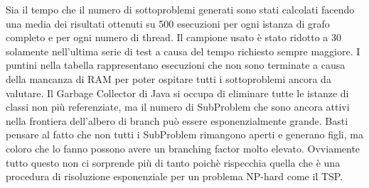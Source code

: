 \documentclass[
	article,			%
	12pt,				%
	oneside,			%
	a4paper,			%
	english,			%
	italian,				%
	sumario=tradicional,
	]{abntex2}
\begin{document}
Sia il tempo che il numero di sottoproblemi generati sono stati calcolati facendo una media dei risultati ottenuti su 500 esecuzioni per ogni istanza di grafo completo e per ogni numero di thread. Il campione usato è stato ridotto a 30 solamente nell'ultima serie di test a causa del tempo richiesto sempre maggiore.
I puntini nella tabella rappresentano esecuzioni che non sono terminate a causa della mancanza di RAM per poter ospitare tutti i sottoproblemi ancora da valutare. Il {\selectfont Garbage Collector} di Java si occupa di eliminare tutte le istanze di classi non più referenziate, ma il numero di {\selectfont SubProblem} che sono ancora attivi nella frontiera dell'albero di branch può essere esponenzialmente grande. Basti pensare al fatto che non tutti i {\selectfont SubProblem} rimangono aperti e generano figli, ma coloro che lo fanno possono avere un branching factor molto elevato.\newline
Ovviamente tutto questo non ci sorprende più di tanto poichè rispecchia quella che è una procedura di risoluzione esponenziale per un problema NP-hard come il TSP.
\end{document}
